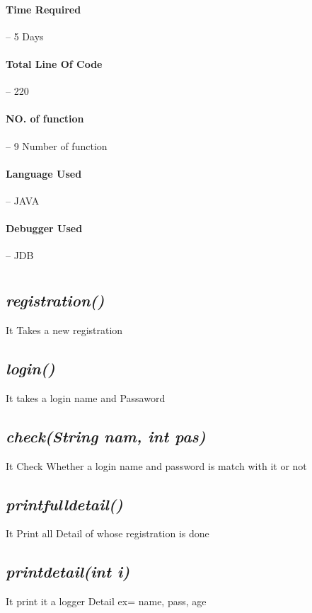 \documentclass[12pt]{article}
\begin{document}
\paragraph{\LARGE Time Required}-- \large 5 Days
\paragraph{\LARGE Total Line Of Code}-- \large 220
\paragraph{\LARGE NO. of function}-- \large 9 Number of function
\paragraph{\LARGE Language Used}-- \large JAVA
\paragraph{\LARGE Debugger Used}-- \large JDB


\pagebreak
\section*{}


\subsection*{\it \bf registration()}
It Takes a new registration

\subsection*{\it \bf  login() }
It takes a login name and Passaword

\subsection*{\it \bf  check(String nam, int pas) }
It Check Whether a login name and password is match with it or not

\subsection*{\it \bf printfulldetail()  }
It Print all Detail of whose registration is done

\subsection*{\it \bf  printdetail(int i) }
It print it a logger Detail 
ex= name, pass, age
\end{document}
